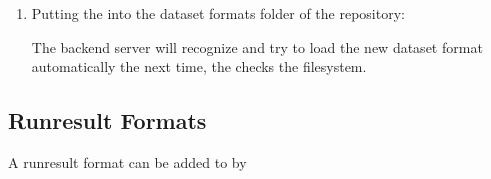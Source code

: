 \begin{enumerate}
			
			\item Putting the  into the dataset formats folder of the repository:
			
			\highlight{\reposuppinputformats}
			
			The backend server will recognize and try to load the new dataset format automatically the next time, the  checks the filesystem.
	\end{enumerate}
	\subsection{Runresult Formats}\label{subsec_extend_runresultformats}
	A runresult format  can be added to \clusteval by
